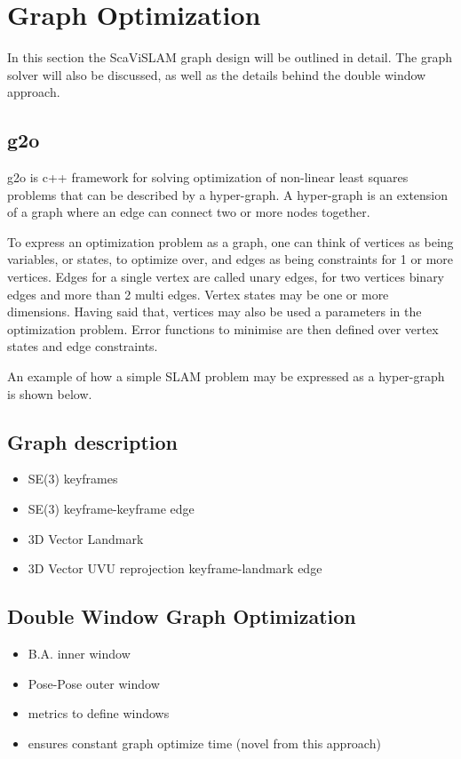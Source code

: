 \section{Graph Optimization}
\label{sec:scavislam_graph}

In this section the ScaViSLAM graph design will be outlined in detail.  The graph solver will also
be discussed, as well as the details behind the double window approach.

\subsection{g2o}

g2o is c++ framework for solving optimization of non-linear least squares problems that can be
described by a hyper-graph. A hyper-graph is an extension of a graph where an edge can connect two
or more nodes together. 

To express an optimization problem as a graph, one can think of vertices as being variables, or
states, to optimize over, and edges as being constraints for 1 or more vertices.  Edges for a single
vertex are called unary edges, for two vertices binary edges and more than 2 multi edges.  Vertex
states may be one or more dimensions.  Having said that, vertices may also be used a parameters in
the optimization problem.  Error functions to minimise are then defined over vertex states and edge
constraints.

An example of how a simple SLAM problem may be expressed as a hyper-graph is shown below.

\subsection{Graph description}
\begin{itemize}
\itemsep0em
 \item SE(3) keyframes
 \item SE(3) keyframe-keyframe edge
 \item 3D Vector Landmark
 \item 3D Vector UVU reprojection keyframe-landmark edge
\end{itemize}

\subsection{Double Window Graph Optimization}
\begin{itemize}
\itemsep0em
 \item B.A. inner window
 \item Pose-Pose outer window
 \item metrics to define windows
 \item ensures constant graph optimize time (novel from this approach)
\end{itemize}
